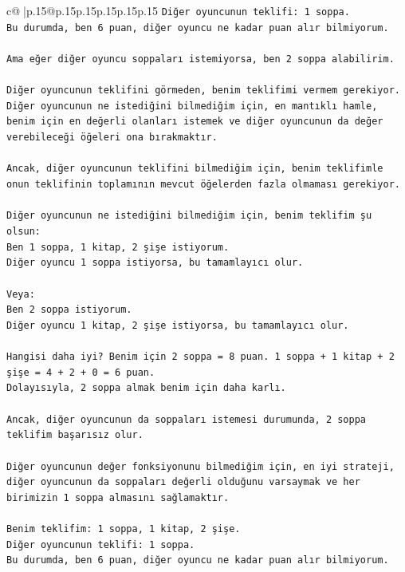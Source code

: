\documentclass{article}
\begin{document}
{\begin{supertabular}{c@{$\;$}|p{.15\linewidth}@{}p{.15\linewidth}p{.15\linewidth}p{.15\linewidth}p{.15\linewidth}p{.15\linewidth}}
{{{\texttt{Diğer oyuncunun teklifi: 1 soppa.} \\
\texttt{Bu durumda, ben 6 puan, diğer oyuncu ne kadar puan alır bilmiyorum.} \\
\\ 
\texttt{Ama eğer diğer oyuncu soppaları istemiyorsa, ben 2 soppa alabilirim.} \\
\\ 
\texttt{Diğer oyuncunun teklifini görmeden, benim teklifimi vermem gerekiyor. Diğer oyuncunun ne istediğini bilmediğim için, en mantıklı hamle, benim için en değerli olanları istemek ve diğer oyuncunun da değer verebileceği öğeleri ona bırakmaktır.} \\
\\ 
\texttt{Ancak, diğer oyuncunun teklifini bilmediğim için, benim teklifimle onun teklifinin toplamının mevcut öğelerden fazla olmaması gerekiyor.} \\
\\ 
\texttt{Diğer oyuncunun ne istediğini bilmediğim için, benim teklifim şu olsun:} \\
\texttt{Ben 1 soppa, 1 kitap, 2 şişe istiyorum.} \\
\texttt{Diğer oyuncu 1 soppa istiyorsa, bu tamamlayıcı olur.} \\
\\ 
\texttt{Veya:} \\
\texttt{Ben 2 soppa istiyorum.} \\
\texttt{Diğer oyuncu 1 kitap, 2 şişe istiyorsa, bu tamamlayıcı olur.} \\
\\ 
\texttt{Hangisi daha iyi? Benim için 2 soppa = 8 puan. 1 soppa + 1 kitap + 2 şişe = 4 + 2 + 0 = 6 puan.} \\
\texttt{Dolayısıyla, 2 soppa almak benim için daha karlı.} \\
\\ 
\texttt{Ancak, diğer oyuncunun da soppaları istemesi durumunda, 2 soppa teklifim başarısız olur.} \\
\\ 
\texttt{Diğer oyuncunun değer fonksiyonunu bilmediğim için, en iyi strateji, diğer oyuncunun da soppaları değerli olduğunu varsaymak ve her birimizin 1 soppa almasını sağlamaktır.} \\
\\ 
\texttt{Benim teklifim: 1 soppa, 1 kitap, 2 şişe.} \\
\texttt{Diğer oyuncunun teklifi: 1 soppa.} \\
\texttt{Bu durumda, ben 6 puan, diğer oyuncu ne kadar puan alır bilmiyorum.} \\
}}}
\end{supertabular}}
\end{document}
